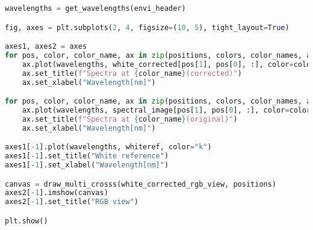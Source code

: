 \begin{lstlisting}[language=python, caption=White correction for SpecimIQ with small reference, label={code:wc-specimiq-small}]
wavelengths = get_wavelengths(envi_header)

fig, axes = plt.subplots(2, 4, figsize=(10, 5), tight_layout=True)

axes1, axes2 = axes
for pos, color, color_name, ax in zip(positions, colors, color_names, axes2):
    ax.plot(wavelengths, white_corrected[pos[1], pos[0], :], color=color)
    ax.set_title(f"Spectra at {color_name}(corrected)")
    ax.set_xlabel("Wavelength[nm]")

for pos, color, color_name, ax in zip(positions, colors, color_names, axes1):
    ax.plot(wavelengths, spectral_image[pos[1], pos[0], :], color=color)
    ax.set_title(f"Spectra at {color_name}(original)")
    ax.set_xlabel("Wavelength[nm]")

axes1[-1].plot(wavelengths, whiteref, color="k")
axes1[-1].set_title("White reference")
axes1[-1].set_xlabel("Wavelength[nm]")

canvas = draw_multi_crosss(white_corrected_rgb_view, positions)
axes2[-1].imshow(canvas)
axes2[-1].set_title("RGB view")

plt.show()

\end{lstlisting}